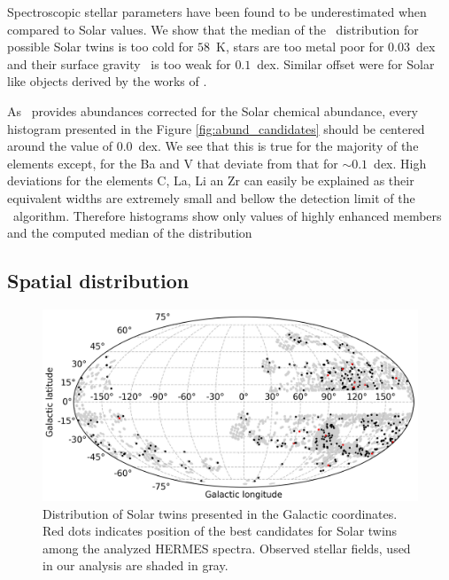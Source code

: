 Spectroscopic stellar parameters have been found to be underestimated when compared to Solar values. We show that the median of the \Teff\ distribution for possible Solar twins is too cold for $58$~K, stars are too metal poor for $0.03$~dex and their surface gravity \Logg\ is too weak for $0.1$~dex. Similar offset were for Solar like objects derived by the works of \cite{2010A&A...512A..54C, 2010A&A...522A..98M, 2012MNRAS.426..484D}.

As \TC\ provides abundances corrected for the Solar chemical abundance, every histogram presented in the Figure \ref{fig:abund_candidates} should be centered around the value of $0.0$~dex. We see that this is true for the majority of the elements except, for the Ba and V that deviate from that for $\sim0.1$~dex. High deviations for the elements C, La, Li an Zr can easily be explained as their equivalent widths are extremely small and bellow the detection limit of the \TC\ algorithm. Therefore histograms show only values of highly enhanced members and the computed median of the distribution 

\subsection{Spatial distribution}
\begin{figure}
	\centering
	\includegraphics[width=\columnwidth]{l_b.png}
	\caption{Distribution of Solar twins presented in the Galactic coordinates. Red dots indicates position of the best candidates for Solar twins among the analyzed HERMES spectra. Observed stellar fields, used in our analysis are shaded in gray.}
	\label{fig:l_b_twins}
\end{figure}

